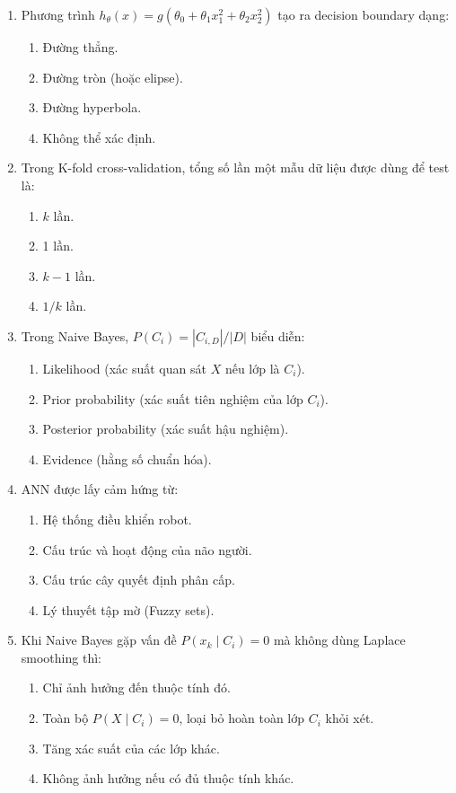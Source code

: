 \documentclass[10pt]{article}
\begin{document}
\begin{enumerate}[leftmargin=*, label=\textbf{Câu \arabic*.}]
    \item Phương trình $h_\theta(x) = g(\theta_0 + \theta_1 x_1^2 + \theta_2 x_2^2)$ tạo ra decision boundary dạng:
    \begin{enumerate}[label=\Alph*.]
        \item Đường thẳng.
        \item Đường tròn (hoặc elipse).
        \item Đường hyperbola.
        \item Không thể xác định.
    \end{enumerate}

    \item Trong K-fold cross-validation, tổng số lần một mẫu dữ liệu được dùng để test là:
    \begin{enumerate}[label=\Alph*.]
        \item $k$ lần.
        \item 1 lần.
        \item $k-1$ lần.
        \item $1/k$ lần.
    \end{enumerate}

    \item Trong Naive Bayes, $P(C_i) = |C_{i,D}| / |D|$ biểu diễn:
    \begin{enumerate}[label=\Alph*.]
        \item Likelihood (xác suất quan sát $X$ nếu lớp là $C_i$).
        \item Prior probability (xác suất tiên nghiệm của lớp $C_i$).
        \item Posterior probability (xác suất hậu nghiệm).
        \item Evidence (hằng số chuẩn hóa).
    \end{enumerate}

    \item ANN được lấy cảm hứng từ:
    \begin{enumerate}[label=\Alph*.]
        \item Hệ thống điều khiển robot.
        \item Cấu trúc và hoạt động của não người.
        \item Cấu trúc cây quyết định phân cấp.
        \item Lý thuyết tập mờ (Fuzzy sets).
    \end{enumerate}

    \item Khi Naive Bayes gặp vấn đề $P(x_k \mid C_i) = 0$ mà không dùng Laplace smoothing thì:
    \begin{enumerate}[label=\Alph*.]
        \item Chỉ ảnh hưởng đến thuộc tính đó.
        \item Toàn bộ $P(X \mid C_i) = 0$, loại bỏ hoàn toàn lớp $C_i$ khỏi xét.
        \item Tăng xác suất của các lớp khác.
        \item Không ảnh hưởng nếu có đủ thuộc tính khác.
    \end{enumerate}


\end{enumerate}
\end{document}
